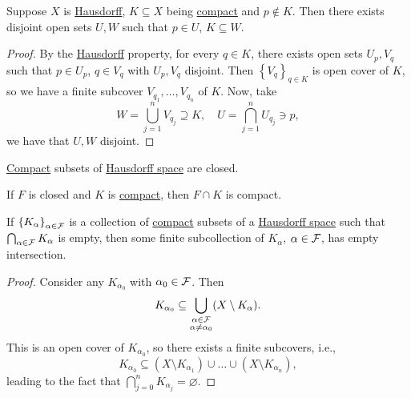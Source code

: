 \begin{theorem}
	Suppose \(X\) is \hyperref[def:Hausdorff]{Hausdorff}, \(K \subseteq X\) being \hyperref[def:compact]{compact} and \(p \notin K\). Then there exists disjoint open sets \(U, W\) such that \(p\in U\), \(K \subseteq W\).
\end{theorem}
\begin{proof}
	By the \hyperref[def:Hausdorff]{Hausdorff} property, for every \(q\in K\), there exists open sets \(U_p, V_q\) such that \(p\in U_p\), \(q\in V_q\) with \(U_p, V_q\) disjoint. Then \(\left\{ V_q \right\} _{q\in K}\) is open cover of \(K\), so we have a finite subcover \(V_{q_1}, \ldots  , V_{q_n}\) of \(K\). Now, take
	\[
		W = \bigcup_{j=1}^{n} V_{q_j} \supseteq K,\quad
		U = \bigcap_{j=1}^{n} U_{q_j} \ni p,
	\]
	we have that \(U, W\) disjoint.
\end{proof}

\begin{corollary}
	\hyperref[def:compact]{Compact} subsets of \hyperref[def:Hausdorff]{Hausdorff space} are closed.
\end{corollary}

\begin{corollary}
	If \(F\) is closed and \(K\) is \hyperref[def:compact]{compact}, then \(F \cap K\) is compact.
\end{corollary}

\begin{theorem}
	If \(\left\{ K_\alpha  \right\}_{\alpha \in \mathcal{\MakeUppercase{f}} } \) is a collection of \hyperref[def:compact]{compact} subsets of a \hyperref[def:Hausdorff]{Hausdorff space} such that \(\bigcap_{\alpha \in \mathcal{\MakeUppercase{f}} } K_\alpha \) is empty, then some finite subcollection of \(K_\alpha \), \(\alpha \in \mathcal{\MakeUppercase{f}} \), has empty intersection.
\end{theorem}
\begin{proof}
	Consider any \(K_{\alpha_0} \) with \(\alpha _0\in \mathcal{\MakeUppercase{f}} \). Then
	\[
		K_{\alpha _0} \subseteq \bigcup_{\substack{\alpha \in \mathcal{\MakeUppercase{f}} \\ \alpha \neq \alpha _0}} (X\setminus K_\alpha ).
	\]
	This is an open cover of \(K_{\alpha _0}\), so there exists a finite subcovers, i.e.,
	\[
		K_{\alpha _0} \subseteq (X \setminus K_{\alpha _1}) \cup \ldots \cup (X \setminus K_{\alpha _n}),
	\]
	leading to the fact that \(\bigcap_{j=0}^{n} K_{\alpha _j} = \varnothing \).
\end{proof}

